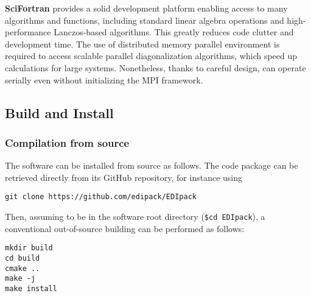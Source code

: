 \documentclass[edipack_sp.tex]{subfiles}
\begin{document}
{\bf SciFortran} provides a solid development platform enabling access to
many algorithms and functions, including standard linear algebra
operations and high-performance Lanczos-based algorithms. This
greatly reduces code clutter and development time.
The use of distributed memory parallel environment 
is required to access scalable parallel diagonalization algorithms,
which speed up calculations for large systems. Nonetheless, thanks to careful design, \NAME can operate serially even without initializing the MPI framework. 

\subsection{Build and Install}\label{sSecInstallBuildInstall}
\subsubsection{Compilation from source}
The software can be installed from source as follows. The code package can
be retrieved directly from its GitHub repository, for instance using
\begin{lstlisting}[style=mybash,numbers=none]
git clone https://github.com/edipack/EDIpack 
\end{lstlisting}
Then, assuming to be in the software root directory ({\tt \$cd EDIpack}), a conventional out-of-source building can be performed as follows:

\begin{lstlisting}[style=mybash,numbers=none]
mkdir build
cd build
cmake ..
make -j
make install
\end{lstlisting}



\end{document}
